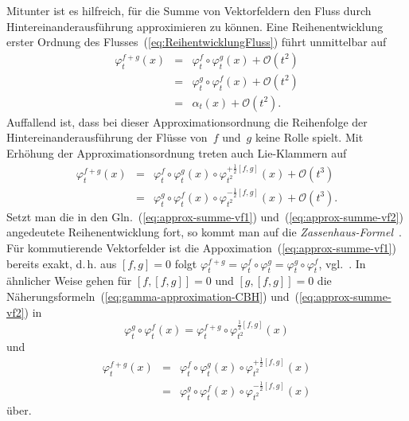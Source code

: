 Mitunter ist es hilfreich, für die Summe von Vektorfeldern den Fluss
durch Hintereinanderausführung approximieren zu können. Eine Reihenentwicklung
erster Ordnung des Flusses~(\ref{eq:ReihentwicklungFluss}) führt
unmittelbar auf
\begin{equation}
\begin{array}{lcl}
\varphi_{t}^{f+g}(x) & = & \varphi_{t}^{f}\circ\varphi_{t}^{g}(x)+\mathcal{O}(t^{2})\\
 & = & \varphi_{t}^{g}\circ\varphi_{t}^{f}(x)+\mathcal{O}(t^{2})\\
 & = & \alpha_{t}(x)+\mathcal{O}(t^{2}).
\end{array}\label{eq:approx-summe-vf1}
\end{equation}
Auffallend ist, dass bei dieser Approximationsordnung die Reihenfolge
der Hintereinanderausführung der Flüsse von~$f$ und~$g$ keine
Rolle spielt. Mit Erhöhung der Approximationsordnung treten auch Lie-Klammern
auf 
\begin{equation}
\begin{array}{ccl}
\varphi_{t}^{f+g}(x) & = & \varphi_{t}^{f}\circ\varphi_{t}^{g}(x)\circ\varphi_{t^{2}}^{+\frac{1}{2}[f,g]}(x)+\mathcal{O}(t^{3})\\
 & = & \varphi_{t}^{g}\circ\varphi_{t}^{f}(x)\circ\varphi_{t^{2}}^{-\frac{1}{2}[f,g]}(x)+\mathcal{O}(t^{3}).
\end{array}\label{eq:approx-summe-vf2}
\end{equation}
Setzt man die in den Gln.~(\ref{eq:approx-summe-vf1}) und~(\ref{eq:approx-summe-vf2})
angedeutete Reihenentwicklung fort, so kommt man auf die \emph{Zassenhaus-Formel}~\cite{magnus1954,suzuki1977}.
Für kommutierende Vektorfelder ist die Appoximation~(\ref{eq:approx-summe-vf1})
bereits exakt, d.\,h. aus $[f,g]=0$ folgt $\varphi_{t}^{f+g}=\varphi_{t}^{f}\circ\varphi_{t}^{g}=\varphi_{t}^{g}\circ\varphi_{t}^{f}$,
vgl.~\cite[Corollary~{2.13.3}]{varadarajan1984}. In ähnlicher Weise
gehen für $[f,[f,g]]=0$ und $[g,[f,g]]=0$ die Näherungsformeln~(\ref{eq:gamma-approximation-CBH})
und~(\ref{eq:approx-summe-vf2}) in 
\[
\varphi_{t}^{g}\circ\varphi_{t}^{f}(x)=\varphi_{t}^{f+g}\circ\varphi_{t^{2}}^{\frac{1}{2}[f,g]}(x)
\]
und 
\[
\begin{array}{lcl}
\varphi_{t}^{f+g}(x) & = & \varphi_{t}^{f}\circ\varphi_{t}^{g}(x)\circ\varphi_{t^{2}}^{+\frac{1}{2}[f,g]}(x)\\
 & = & \varphi_{t}^{g}\circ\varphi_{t}^{f}(x)\circ\varphi_{t^{2}}^{-\frac{1}{2}[f,g]}(x)
\end{array}
\]
über.

